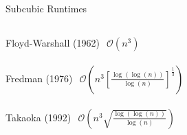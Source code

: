 \begin{frame}{Subcubic Runtimes}
    \begin{columns}
        \begin{column}{.252\linewidth}
            {
                \begin{alertblock}{Floyd-Warshall (1962)}
                    $\begin{aligned}
                        \mathcal{O}\left( n^3 \right)
                    \end{aligned}$
                \end{alertblock}
            }

            {
                \begin{alertblock}{Fredman (1976)}
                    $\begin{aligned}
                        \mathcal{O}\left( n^3 {\left[ \frac{\log(\log(n))}{\log(n)} \right]}^{\frac{1}{3}} \right)
                    \end{aligned}$
                \end{alertblock}
            }
            
            {
                \begin{alertblock}{Takaoka (1992)}
                    $\begin{aligned}
                        \mathcal{O}\left( n^3 \sqrt{\frac{\log(\log(n))}{\log(n)}} \right)
                    \end{aligned}$
                \end{alertblock}
            }
            

\end{column}
\end{columns}
\end{frame}
